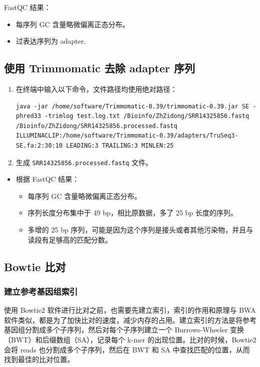 \documentclass[UTF8]{ctexart}
\begin{document}
FastQC 结果：
\begin{itemize}
	\item 每序列 GC 含量略微偏离正态分布。
	\item 过表达序列为 adapter.
\end{itemize}

\subsection{ 使用 Trimmomatic 去除 adapter 序列}

\begin{enumerate}
	\item 在终端中输入以下命令，文件路径均使用绝对路径：
	\begin{lstlisting}
java -jar /home/software/Trimmomatic-0.39/trimmomatic-0.39.jar SE -phred33 -trimlog test.log.txt /Bioinfo/ZhZidong/SRR14325856.fastq /Bioinfo/ZhZidong/SRR14325856.processed.fastq ILLUMINACLIP:/home/software/Trimmomatic-0.39/adapters/TruSeq3-SE.fa:2:30:10 LEADING:3 TRAILING:3 MINLEN:25 
	\end{lstlisting}
	\item 生成 \verb|SRR14325856.processed.fastq| 文件。
\end{enumerate}

\begin{itemize}
	\item 根据 FastQC 结果：
	\begin{itemize}
		\item 每序列 GC 含量略微偏离正态分布。
		\item 序列长度分布集中于 49 bp，相比原数据，多了 25 bp 长度的序列。
		\item 多增的 25 bp 序列，可能是因为这个序列是接头或者其他污染物，并且与读段有足够高的匹配分数。
	\end{itemize}
\end{itemize}

\subsection{Bowtie 比对}

\subsubsection{建立参考基因组索引}

使用 Bowtie2 软件进行比对之前，也需要先建立索引，索引的作用和原理与 BWA 软件类似，都是为了加快比对的速度，减少内存的占用。建立索引的方法是将参考基因组分割成多个子序列，然后对每个子序列建立一个 Burrows-Wheeler 变换（BWT）和后缀数组（SA），记录每个 k-mer 的出现位置。比对的时候，Bowtie2 会将 reads 也分割成多个子序列，然后在 BWT 和 SA 中查找匹配的位置，从而找到最佳的比对位置。
\end{document}
